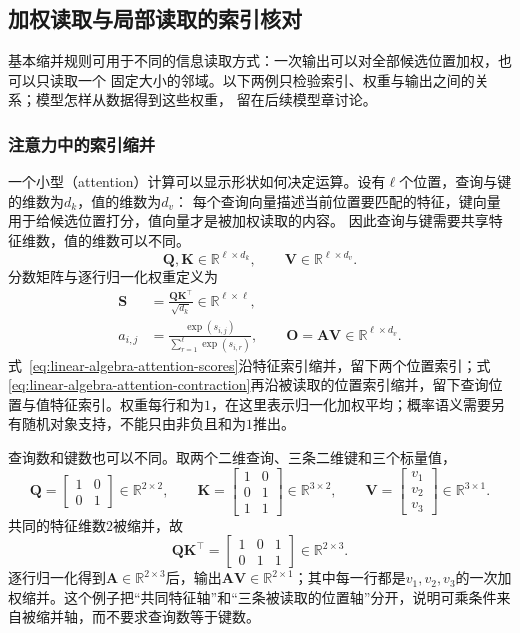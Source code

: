 \subsection{加权读取与局部读取的索引核对}

基本缩并规则可用于不同的信息读取方式：一次输出可以对全部候选位置加权，也可以只读取一个
固定大小的邻域。以下两例只检验索引、权重与输出之间的关系；模型怎样从数据得到这些权重，
留在后续模型章讨论。

\subsubsection{注意力中的索引缩并}

一个小型（attention）计算可以显示形状如何决定运算。设有$\ell$个位置，查询与键的维数为$d_k$，值的维数为$d_v$：
每个查询向量描述当前位置要匹配的特征，键向量用于给候选位置打分，值向量才是被加权读取的内容。
因此查询与键需要共享特征维数，值的维数可以不同。
\[
  \bm{Q},\bm{K}\in\mathbb{R}^{\ell\times d_k},
  \qquad
  \bm{V}\in\mathbb{R}^{\ell\times d_v}.
\]
分数矩阵与逐行归一化权重定义为
\begin{align}
  \bm{S}
  &=
  \frac{\bm{Q}\bm{K}^{\top}}{\sqrt{d_k}}
  \in\mathbb{R}^{\ell\times\ell},
  \label{eq:linear-algebra-attention-scores}\\
  a_{i,j}
  &=
  \frac{\exp(s_{i,j})}
       {\sum_{r=1}^{\ell}\exp(s_{i,r})},
  \qquad
  \bm{O}
  =
  \bm{A}\bm{V}
  \in\mathbb{R}^{\ell\times d_v}.
  \label{eq:linear-algebra-attention-contraction}
\end{align}
式~\eqref{eq:linear-algebra-attention-scores}沿特征索引缩并，留下两个位置索引；式\eqref{eq:linear-algebra-attention-contraction}再沿被读取的位置索引缩并，留下查询位置与值特征索引。权重每行和为$1$，在这里表示归一化加权平均；概率语义需要另有随机对象支持，不能只由非负且和为$1$推出。

查询数和键数也可以不同。取两个二维查询、三条二维键和三个标量值，
\[
  \bm{Q}
  =
  \begin{bmatrix}
    1&0\\
    0&1
  \end{bmatrix}
  \in\mathbb{R}^{2\times2},
  \qquad
  \bm{K}
  =
  \begin{bmatrix}
    1&0\\
    0&1\\
    1&1
  \end{bmatrix}
  \in\mathbb{R}^{3\times2},
  \qquad
  \bm{V}
  =
  \begin{bmatrix}v_1\\v_2\\v_3\end{bmatrix}
  \in\mathbb{R}^{3\times1}.
\]
共同的特征维数$2$被缩并，故
\[
  \bm{Q}\bm{K}^{\top}
  =
  \begin{bmatrix}
    1&0&1\\
    0&1&1
  \end{bmatrix}
  \in\mathbb{R}^{2\times3}.
\]
逐行归一化得到$\bm{A}\in\mathbb{R}^{2\times3}$后，输出$\bm{A}\bm{V}\in\mathbb{R}^{2\times1}$；其中每一行都是$v_1,v_2,v_3$的一次加权缩并。这个例子把“共同特征轴”和“三条被读取的位置轴”分开，说明可乘条件来自被缩并轴，而不要求查询数等于键数。


